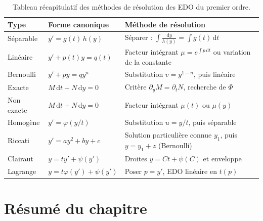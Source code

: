 \documentclass[12pt,a4paper,openany]{book}
\theoremstyle{definition}
\theoremstyle{plain}
\theoremstyle{remark}
\newcommand{\dd}{\mathrm{d}}
\begin{document}
\begin{table}[ht]
\centering
\caption{Tableau récapitulatif des méthodes de résolution des EDO du premier ordre.}
\label{tab:recap-methodes}
\renewcommand{\arraystretch}{1.4}
\begin{tabular}{@{}p{3cm}p{3.5cm}p{6cm}@{}}
\toprule
\textbf{Type} & \textbf{Forme canonique} & \textbf{Méthode de résolution} \\
\midrule
Séparable & $y' = g(t)\,h(y)$ & Séparer : $\int \frac{\dd y}{h(y)} = \int g(t)\,\dd t$ \\[4pt]
Linéaire & $y' + p(t)y = q(t)$ & Facteur intégrant $\mu = e^{\int p\,\dd t}$ ou variation de la constante \\[4pt]
Bernoulli & $y' + py = qy^n$ & Substitution $v = y^{1-n}$, puis linéaire \\[4pt]
Exacte & $M\,\dd t + N\,\dd y = 0$ & Critère $\partial_y M = \partial_t N$, recherche de $\Phi$ \\[4pt]
Non exacte & $M\,\dd t + N\,\dd y = 0$ & Facteur intégrant $\mu(t)$ ou $\mu(y)$ \\[4pt]
Homogène & $y' = \varphi(y/t)$ & Substitution $u = y/t$, puis séparable \\[4pt]
Riccati & $y' = ay^2 + by + c$ & Solution particulière connue $y_1$, puis $y = y_1 + z$ (Bernoulli) \\[4pt]
Clairaut & $y = ty' + \psi(y')$ & Droites $y = Ct + \psi(C)$ et enveloppe \\[4pt]
Lagrange & $y = t\varphi(y') + \psi(y')$ & Poser $p = y'$, EDO linéaire en $t(p)$ \\
\bottomrule
\end{tabular}
\end{table}

\section{Résumé du chapitre}
\label{sec:resume-ch2}
\end{document}
